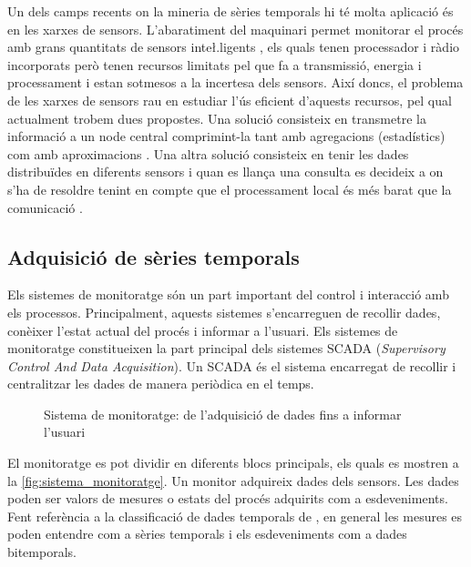Un dels camps recents on la mineria de sèries temporals hi té molta aplicació és en les xarxes de sensors. L'abaratiment del maquinari permet monitorar el procés amb grans quantitats de sensors inte\l.ligents \parencite{jainagrawal05,yaogehrke02}, els quals tenen processador i ràdio incorporats però tenen recursos limitats pel que fa a transmissió, energia i processament i estan sotmesos a la incertesa dels sensors. Així doncs, el problema  de les xarxes de sensors rau en estudiar l'ús eficient d'aquests recursos, pel qual actualment trobem dues propostes.
Una solució consisteix en transmetre la informació a un node central comprimint-la tant amb agregacions (estadístics) com amb aproximacions \parencite{deligiannakis07}.
Una altra solució consisteix en tenir les dades distribuïdes en diferents sensors i quan es llança una consulta es decideix a on s'ha de resoldre tenint en compte que el processament local és més barat que la comunicació \parencite{yaogehrke02,gehrkemadden04,bonnet01}. 


\subsection{Adquisició de sèries temporals}

Els sistemes de monitoratge són un part important del control i interacció amb els processos. Principalment, aquests sistemes s'encarreguen de recollir dades, conèixer l'estat actual del procés i informar a l'usuari. Els sistemes de monitoratge constitueixen la part principal dels sistemes SCADA (\emph{Supervisory Control And Data Acquisition}). Un SCADA  és el sistema encarregat de recollir i centralitzar les dades de manera periòdica en el temps.



\begin{figure}[tp]
  \begin{center}
    \scriptsize 
    
  \end{center}
  \caption{Sistema de monitoratge: de l'adquisició de dades fins a informar l'usuari}
  \label{fig:sistema_monitoratge}
\end{figure}


El monitoratge es pot dividir en diferents blocs principals, els quals es mostren a la \autoref{fig:sistema_monitoratge}. Un monitor adquireix dades dels sensors. Les dades poden ser valors de mesures o estats del procés adquirits com a esdeveniments. Fent referència a la classificació de dades temporals de \textcite{assfalg08:thesis}, en general les mesures es poden entendre com a sèries temporals i els esdeveniments com a dades bitemporals.

